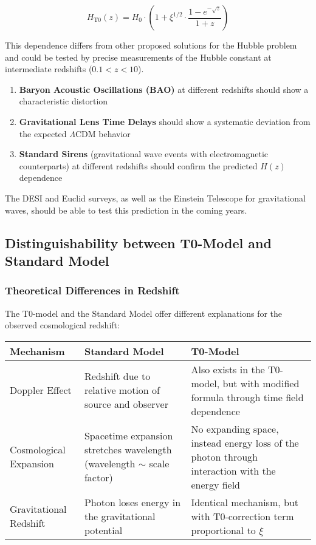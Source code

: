 \documentclass[12pt,a4paper]{article}
\theoremstyle{definition}
\begin{document}
	\begin{equation}
		H_{\text{T0}}(z) = H_0 \cdot \left(1 + \xi^{1/2} \cdot \frac{1 - e^{-\sqrt{z}}}{1 + z}\right)
	\end{equation}
	
	This dependence differs from other proposed solutions for the Hubble problem and could be tested by precise measurements of the Hubble constant at intermediate redshifts ($0.1 < z < 10$).
	
	\begin{enumerate}
		\item \textbf{Baryon Acoustic Oscillations (BAO)} at different redshifts should show a characteristic distortion
		
		\item \textbf{Gravitational Lens Time Delays} should show a systematic deviation from the expected $\Lambda$CDM behavior
		
		\item \textbf{Standard Sirens} (gravitational wave events with electromagnetic counterparts) at different redshifts should confirm the predicted $H(z)$ dependence
	\end{enumerate}
	
	The DESI and Euclid surveys, as well as the Einstein Telescope for gravitational waves, should be able to test this prediction in the coming years.\subsection{Distinguishability between T0-Model and Standard Model}
	
	\subsubsection{Theoretical Differences in Redshift}
	
	The T0-model and the Standard Model offer different explanations for the observed cosmological redshift:
	
	\begin{center}
		\begin{tabular}{|p{3.5cm}|p{5.5cm}|p{5.5cm}|}
			\hline
			\textbf{Mechanism} & \textbf{Standard Model} & \textbf{T0-Model} \\
			\hline
			Doppler Effect & Redshift due to relative motion of source and observer & Also exists in the T0-model, but with modified formula through time field dependence \\
			\hline
			Cosmological Expansion & Spacetime expansion stretches wavelength (wavelength $\sim$ scale factor) & No expanding space, instead energy loss of the photon through interaction with the energy field \\
			\hline
			Gravitational Redshift & Photon loses energy in the gravitational potential & Identical mechanism, but with T0-correction term proportional to $\xi$ \\
			\hline
		\end{tabular}
	\end{center}
	
\end{document}

